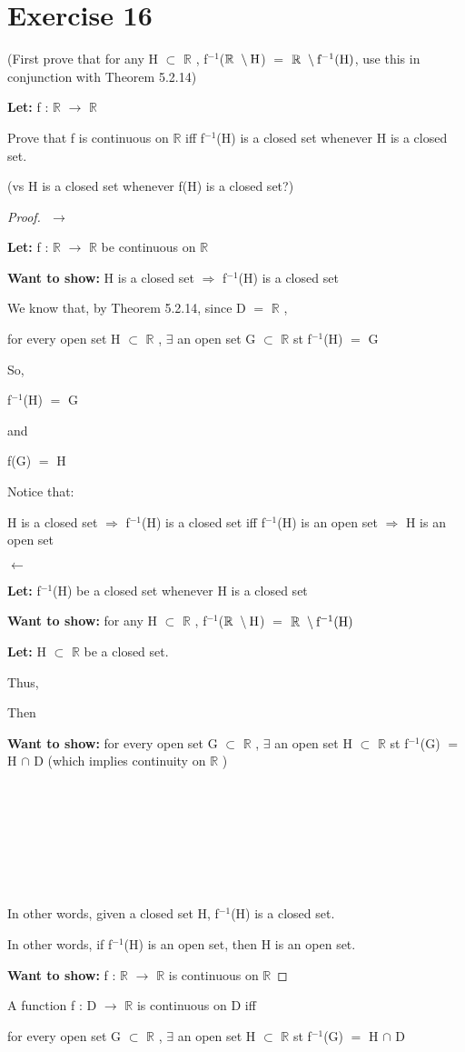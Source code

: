 \documentclass{article}
\newcommand{\mt}[1]{\ensuremath{#1}}
\newcommand\bsc[2][\DefaultOpt]{%
  \def\DefaultOpt{#2}%
  \section[#1]{#2}%
}
\newcommand{\bgpf}{\begin{proof} $ $\newline}
\newcommand{\lt}[1]{\textbf{Let: } #1}
\newcommand{\wts}[1]{\textbf{Want to show: } #1}
\newcommand{\epf}{\end{proof}}
\newcommand{\br}{\mt{\mathbb{R}} }       %
\newcommand{\exs}{\mt{\exists} }
\newcommand{\sbs}{\mt{\subset} }         %
\newcommand{\lra}{ \mt{\longrightarrow} } %
\newcommand{\rar}{ \mt{\Rightarrow} }     %
\newcommand{\lla}{ \mt{\longleftarrow} }  %
\newcommand{\eql}{\mt{=} }
\newcommand{\uf}[2]{#1\mt{^{#2}}}
\newcommand{\bnt}[2]{\mt{\textrm{#1}\setminus{\textrm{#2}}}}
\newcommand{\inn}{\mt{\cap} }
\begin{document}
\bsc{Exercise 16}{

(First prove that for any H \sbs \br, \uf{f}{-1}(\bnt{\br}{H}) \eql \bnt{\br}{\uf{f}{-1}(H)}, use this in conjunction with Theorem 5.2.14)

\lt{f : \br \lra \br}

Prove that f is continuous on \br iff \uf{f}{-1}(H) is a closed set whenever H is a closed set.

(vs H is a closed set whenever f(H) is a closed set?)

\bgpf
\lra

\lt{f : \br \lra \br be continuous on \br}

\wts{H is a closed set \rar \uf{f}{-1}(H) is a closed set}

We know that, by Theorem 5.2.14, since D \eql \br,

for every open set H \sbs \br, \exs an open set G \sbs \br st \uf{f}{-1}(H) \eql G

So, 

\uf{f}{-1}(H) \eql G

and

f(G) \eql H

Notice that:

H is a closed set \rar \uf{f}{-1}(H) is a closed set iff \uf{f}{-1}(H) is an open set \rar H is an open set






\lla

\lt{\uf{f}{-1}(H) be a closed set whenever H is a closed set}

\wts{for any H \sbs \br, \uf{f}{-1}(\bnt{\br}{H}) \eql \bnt{\br}{\uf{f}{-1}(H)}}

\lt{H \sbs \br be a closed set.}

Thus, 



Then

\wts{for every open set G \sbs \br, \exs an open set H \sbs \br st \uf{f}{-1}(G) \eql H \inn D (which implies continuity on \br)}

\

\

\

\

In other words, given a closed set H, \uf{f}{-1}(H) is a closed set.

In other words, if \uf{f}{-1}(H) is an open set, then H is an open set.

\wts{f : \br \lra \br is continuous on \br}

\epf

A function f : D \lra \br is continuous on D iff 

for every open set G \sbs \br, \exs an open set H \sbs \br st \uf{f}{-1}(G) \eql H \inn D

}
\end{document}
